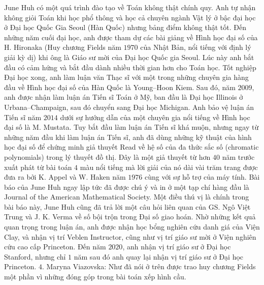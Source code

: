 \begin{multicols}{2}
	June Huh có một quá trình đào tạo về Toán không thật chính quy. Anh tự nhận không giỏi Toán khi học phổ thông và học cả chuyên ngành Vật lý ở bậc đại học ở Đại học Quốc Gia Seoul (Hàn Quốc) nhưng bảng điểm không thật tốt. Đến những năm cuối đại học, anh được tham dự các bài giảng về Hình học đại số của H. Hironaka (Huy chương Fields năm $1970$ của Nhật Bản, nổi tiếng với định lý giải kỳ dị) khi ông là Giáo sư mời của Đại học Quốc gia Seoul. Lúc này anh bắt đầu có cảm hứng và bắt đầu dành nhiều thời gian hơn cho Toán học. Tốt nghiệp Đại học xong, anh làm luận văn Thạc sĩ với một trong những chuyên gia hàng đầu về Hình học đại số của Hàn Quốc là Young--Hoon Kiem. Sau đó, năm $2009$, anh được nhận làm luận án Tiến sĩ Toán ở Mỹ, ban đầu là Đại học Illinois ở Urbana--Champaign, sau đó chuyển sang Đại học Michigan. Anh bảo vệ luận án Tiến sĩ năm $2014$ dưới sự hướng dẫn của một chuyên gia nổi tiếng về Hình học đại số là M. Mustata. Tuy bắt đầu làm luận án Tiến sĩ khá muộn, nhưng ngay từ những năm đầu khi làm luận án Tiến sĩ, anh đã dùng những kỹ thuật của hình học đại số để chứng minh giả thuyết Read về hệ số của đa thức sắc số (chromatic polynomials) trong lý thuyết đồ thị. Đây là một giả thuyết từ hơn $40$ năm trước xuất phát từ bài toán $4$ màu nổi tiếng mà lời giải của nó dài vài trăm trang được đưa ra bởi K. Appel và W. Haken năm $1976$ cùng với sự hỗ trợ của máy tính. Bài báo của June Huh ngay lập tức đã được chú ý và in ở một tạp chí hàng đầu là Journal of the American Mathematical Society. Một điều thú vị là chính trong bài báo này, June Huh cũng đã trả lời một câu hỏi liên quan của GS. Ngô Việt Trung và J. K. Verma về số bội trộn trong Đại số giao hoán. Nhờ những kết quả quan trọng trong luận án, anh được nhận học bổng nghiên cứu danh giá của Viện Clay, và nhận vị trí Veblen Instructor, cũng như vị trí giáo sư mời ở Viện nghiên cứu cao cấp Princeton. Đến năm $2020$, anh nhận vị trí giáo sư ở Đại học Stanford, nhưng chỉ $1$ năm sau đó anh quay lại nhận vị trí giáo sư ở Đại học Princeton.     
	\vskip 0.1cm
	$4.$ Maryna Viazovska: Như đã nói ở trên được trao huy chương Fields một phần vì những đóng góp trong bài toán xếp hình cầu.
	\vskip 0.1cm

\end{multicols}
